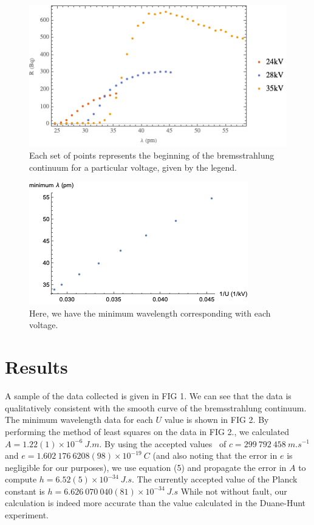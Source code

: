 \documentclass[aps,prl,preprint,groupedaddress]{revtex4-2}
\begin{document}
	\begin{figure}
		\includegraphics{res/rad_data.png}
		\caption{Each set of points represents the
		                beginning of the bremsstrahlung continuum for a particular voltage,
		                given by the legend.}
	\end{figure}
	\begin{figure}
		\includegraphics{res/min_wavelength.png}
		\caption{Here, we have the minimum wavelength 
		        corresponding with each voltage.}
	\end{figure}
\section{Results}
A sample of the data collected is given in FIG 1. We can see that the data is qualitatively consistent with the smooth curve of the bremsstrahlung continuum. The minimum wavelength data for each $U$ value is shown in FIG 2. By performing the method of least squares on the data in FIG 2., we calculated $A = 1.22(1) \times 10^{-6}~\si{J.m}$. By using the accepted values~\cite{mohr} of $c = 299~792~458~\si{m.s^{-1}}$ and $e = 1.602~176~6208(98) \times 10^{-19}~\si{C}$ (and also noting that the error in $e$ is negligible for our purposes), we use equation (5) and propagate the error in $A$ to compute $h = 6.52(5) \times 10^{-34}~\si{J.s}$. The currently accepted value of the Planck constant is $h = 6.626~070~040(81) \times 10^{-34}~\si{J.s}$ While not without fault, our calculation is indeed more accurate than the value calculated in the Duane-Hunt experiment.
\end{document}

